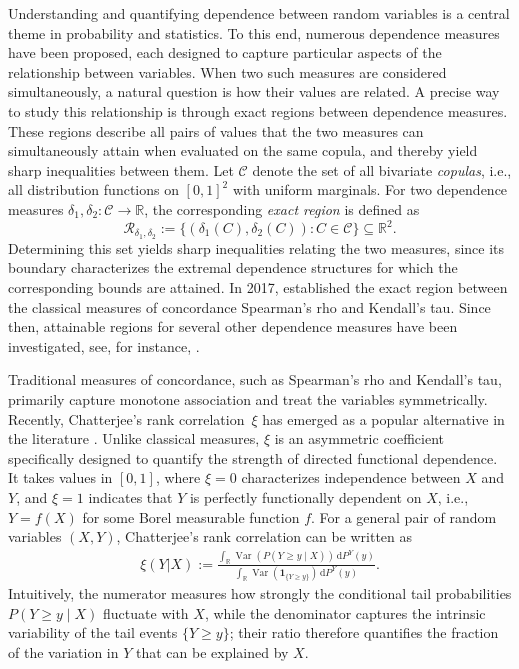 \documentclass{article}
\newcommand{\1}{\mathds{1}}
\DeclareMathOperator{\Var}{Var}
\newcommand{\de}{\mathrm{\,d}}
\newcommand{\CC}{\mathcal{C}}  %
\newcommand{\R}{\mathbb{R}}
\newcommand{\RR}{\mathcal{R}}
\begin{document}
Understanding and quantifying dependence between random variables is a central theme in probability and statistics.
To this end, numerous dependence measures have been proposed, each designed to capture particular aspects of the relationship between variables.
When two such measures are considered simultaneously, a natural question is how their values are related.
A precise way to study this relationship is through exact regions between dependence measures.
These regions describe all pairs of values that the two measures can simultaneously attain when evaluated on the same copula, and thereby yield sharp inequalities between them.
Let $\CC$ denote the set of all bivariate \emph{copulas}, i.e., all distribution functions on $[0,1]^2$ with uniform marginals.
For two dependence measures
$\delta_1,\delta_2\colon\CC\rightarrow\R$,
the corresponding \emph{exact region} is defined as
\[
\RR_{\delta_1,\delta_2}
:=
\{(\delta_1(C),\delta_2(C)) : C\in\CC\}
\subseteq \R^2 .
\]
Determining this set yields sharp inequalities relating the two measures,
since its boundary characterizes the extremal dependence structures for
which the corresponding bounds are attained.
In 2017, \cite{schreyer2017exact} established the exact region between the classical measures of concordance Spearman's rho and Kendall's tau. 
Since then, attainable regions for several other dependence measures have been investigated, see, for instance, \cite{bukovvsek2022exact,bukovvsek2023exact}.

Traditional measures of concordance, such as Spearman's rho and Kendall's tau, primarily capture monotone association and treat the variables symmetrically. %
Recently, Chatterjee's rank correlation~$\xi$ has emerged as a popular alternative in the literature \cite{chatterjee2020,chatterjee2021}. Unlike classical measures, $\xi$ is an asymmetric coefficient specifically designed to quantify the strength of directed functional dependence. It takes values in $[0,1]$, where $\xi=0$ characterizes independence between $X$ and $Y$, and $\xi=1$ indicates that $Y$ is perfectly functionally dependent on $X$, i.e., $Y=f(X)$ for some Borel measurable function $f$.
For a general pair of random variables $(X,Y)$, Chatterjee's rank correlation can be written as
\begin{align}\label{eq:chatt}
\xi(Y|X)
  :=
  \frac{\int_{\R} \Var\left(P(Y \ge y \mid X)\right)\de P^Y(y)}
       {\int_{\R} \Var\left(\mathbf 1_{\{Y \ge y\}}\right)\de P^Y(y)} .
\end{align}
Intuitively, the numerator measures how strongly the conditional tail probabilities $P(Y\ge y\mid X)$ fluctuate with $X$, while the denominator captures the intrinsic variability of the tail events $\{Y\ge y\}$; their ratio therefore quantifies the fraction of the variation in $Y$ that can be explained by $X$.
\end{document}
